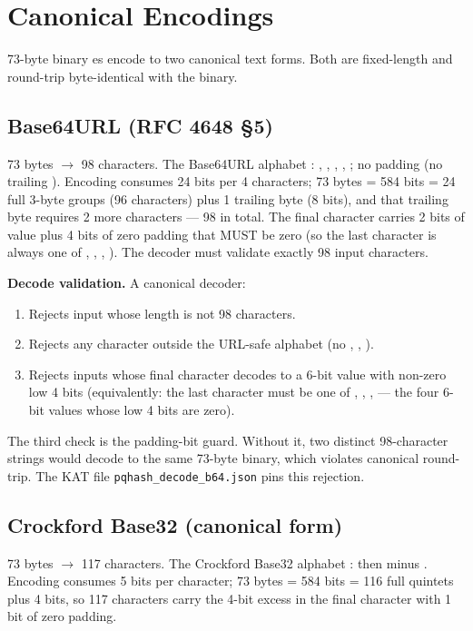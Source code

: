 \section{Canonical Encodings}
\label{sec:encodings}

73-byte binary \pqhash{}es encode to two canonical text forms. Both are fixed-length and round-trip byte-identical with the binary.

\subsection{Base64URL (RFC 4648 §5)}

73 bytes $\to$ 98 characters. The Base64URL alphabet \citep{rfc4648}: , , , \code{-}, \code{\_}; no padding (no trailing \code{=}). Encoding consumes 24 bits per 4 characters; 73 bytes = 584 bits = 24 full 3-byte groups (96 characters) plus 1 trailing byte (8 bits), and that trailing byte requires 2 more characters --- 98 in total. The final character carries 2 bits of value plus 4 bits of zero padding that MUST be zero (so the last character is always one of , , , ). The decoder must validate exactly 98 input characters.

\textbf{Decode validation.} A canonical decoder:
\begin{enumerate}
  \item Rejects input whose length is not 98 characters.
  \item Rejects any character outside the URL-safe alphabet (no \code{+}, \code{/}, \code{=}).
  \item Rejects inputs whose final character decodes to a 6-bit value with non-zero low 4 bits (equivalently: the last character must be one of , , ,  --- the four 6-bit values whose low 4 bits are zero).
\end{enumerate}

The third check is the padding-bit guard. Without it, two distinct 98-character strings would decode to the same 73-byte binary, which violates canonical round-trip. The KAT file \texttt{pqhash\_decode\_b64.json} pins this rejection.

\subsection{Crockford Base32 (canonical form)}

73 bytes $\to$ 117 characters. The Crockford Base32 alphabet \citep{crockford}:  then  minus . Encoding consumes 5 bits per character; 73 bytes = 584 bits = 116 full quintets plus 4 bits, so 117 characters carry the 4-bit excess in the final character with 1 bit of zero padding.

